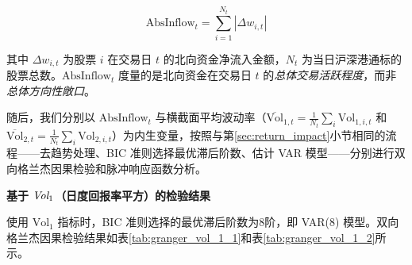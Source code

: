 \documentclass{article}
\begin{document}
\begin{equation}
    \text{AbsInflow}_t = \sum_{i=1}^{N_t} \left|\Delta w_{i,t}\right|
    \label{eq:abs_inflow}
\end{equation}

\noindent 其中 $\Delta w_{i,t}$ 为股票 $i$ 在交易日 $t$ 的北向资金净流入金额，$N_t$ 为当日沪深港通标的股票总数。$\text{AbsInflow}_t$ 度量的是北向资金在交易日 $t$ 的\textit{总体交易活跃程度}，而非\textit{总体方向性敞口}。

随后，我们分别以 $\text{AbsInflow}_t$ 与横截面平均波动率（$\overline{\text{Vol}}_{1,t} = \frac{1}{N_t}\sum_{i}\text{Vol}_{1,i,t}$ 和 $\overline{\text{Vol}}_{2,t} = \frac{1}{N_t}\sum_{i}\text{Vol}_{2,i,t}$）为内生变量，按照与第\ref{sec:return_impact}小节相同的流程——去趋势处理、BIC 准则选择最优滞后阶数、估计 VAR 模型——分别进行双向格兰杰因果检验和脉冲响应函数分析。

\vspace{0.5em}
\noindent\textbf{基于 $\emph{Vol}_1$（日度回报率平方）的检验结果}

使用 $\text{Vol}_1$ 指标时，BIC 准则选择的最优滞后阶数为8阶，即 VAR(8) 模型。双向格兰杰因果检验结果如表\ref{tab:granger_vol_1_1}和表\ref{tab:granger_vol_1_2}所示。

\begin{table}[htbp]
    \centering
    \caption{格兰杰因果检验（$\text{Vol}_1$）：北向资金交易强度对横截面平均波动率的预测效应}
    \label{tab:granger_vol_1_1}
\end{table}
\end{document}
